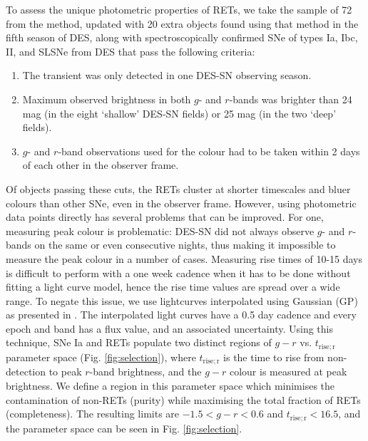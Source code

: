 \documentclass[fleqn,usenatbib,]{mnras}
\newcommand{\replychris}[1]{\color{magenta}#1 \color{black}}
\newcommand{\replylluis}[1]{\color{brown}#1 \color{black}}
\begin{document}
To assess the unique photometric properties of RETs, we take the sample of 72 from the  method, updated with 20 extra objects found using that method in the fifth season of DES, along with spectroscopically confirmed SNe of types Ia, Ibc, II, and SLSNe from DES that pass the following criteria:
\begin{enumerate}
\item The transient was only detected in one DES-SN observing season.
\item Maximum observed brightness in both $g$- and $r$-bands was brighter than 24 mag (in the eight `shallow' DES-SN fields) or 25 mag (in the two `deep' fields).
\item $g$- and $r$-band observations used for the colour had to be taken within 2 days of each other in the observer frame.
\end{enumerate}

Of objects passing these cuts, the RETs cluster at shorter timescales and bluer colours than other SNe, even in the observer frame. However, using photometric data points directly has several problems that can be improved. For one, measuring peak colour is problematic: DES-SN did not always observe $g$- and $r$-bands on the same or even consecutive nights, thus making it impossible to measure the peak colour in a number of cases. Measuring rise times of 10-15 days is difficult to perform with a one week cadence when it has to be done without fitting a light curve model, hence the rise time values are spread over a wide range. To negate this issue, we use lightcurves interpolated using Gaussian  (GP) as presented in \citet{Pursiainen2019}. The interpolated light curves have a 0.5 day cadence and every epoch \replychris{and band} has a flux value, and an associated uncertainty. Using this technique, SNe Ia and RETs populate two distinct regions of $g-r$ \replylluis{vs.} $t_{\mathrm{rise; r}}$ parameter space (Fig. \ref{fig:selection}), \replychris{where $t_{\mathrm{rise; r}}$ is the time to rise from non-detection to peak $r$-band brightness, and the $g-r$ colour is measured at peak brightness.} We define a region in this parameter space which minimises the contamination of non-RETs (purity) while maximising the total fraction of RETs (completeness). The resulting limits are $-1.5 < g-r < 0.6 $ and $t_{\mathrm{rise; r}} <16.5$, and the parameter space can be seen in Fig. \ref{fig:selection}.
\end{document}
